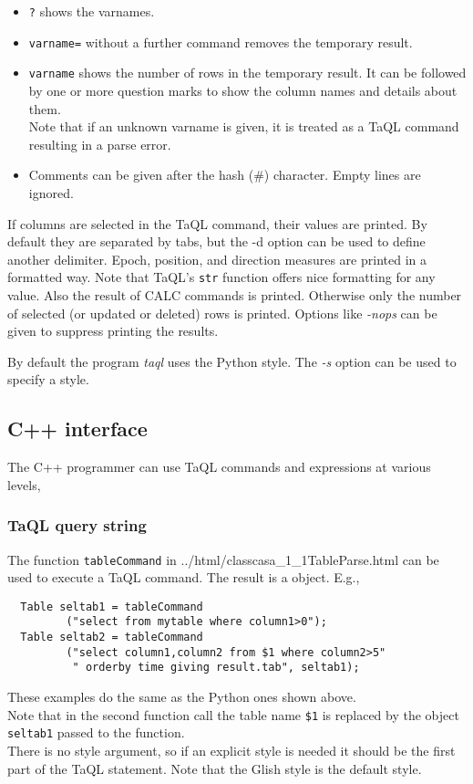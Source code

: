 \begin {itemize}
\begin{itemize}
      \texttt{SELECT FROM \$varname} or \texttt{SHOW TABLE \$varname}.
    \item \texttt{?} shows the varnames.
    \item \texttt{varname=} without a further command removes the
      temporary result.
    \item \texttt{varname} shows the number of rows in the temporary
      result. It can be followed by one or more question marks to show
      the column names and details about them.
      \\Note that if an unknown varname is given, it is treated as a
      TaQL command resulting in a parse error.
    \item Comments can be given after the hash (\#) character. Empty
      lines are ignored.
    \end{itemize}
  \end{itemize}
  If columns are selected in the TaQL command, their values are
  printed. By default they are separated by tabs, but the -d option can
  be used to define another delimiter.
  Epoch, position, and direction measures are printed in a
  formatted way.  Note that TaQL's \texttt{str} function offers nice
  formatting for any value. Also the result of
  CALC commands is printed. Otherwise only the number of selected (or
  updated or deleted) rows is printed.
  Options like {\em -nops} can be given to suppress printing the results.

  By default the program {\em taql} uses the Python style. The {\em -s}
  option can be used to specify a style.

\subsection{C++ interface}
The C++ programmer can use TaQL commands and expressions at various levels,
\subsubsection{TaQL query string}
    The function \texttt{tableCommand} in
    {../html/classcasa_1_1TableParse.html}
    can be used to execute a TaQL command. The result is a
    object. E.g.,
\begin{verbatim}
  Table seltab1 = tableCommand
         ("select from mytable where column1>0");
  Table seltab2 = tableCommand
         ("select column1,column2 from $1 where column2>5"
          " orderby time giving result.tab", seltab1);
\end{verbatim}
    These examples do the same as the Python ones shown above.
    \\Note that in the second function call the table name
    \texttt{\$1} is replaced by the object \texttt{seltab1}
    passed to the function.
    \\There is no style argument, so if an explicit style is needed it
    should be the first part of the TaQL statement. Note that the
    Glish style is the default style.

